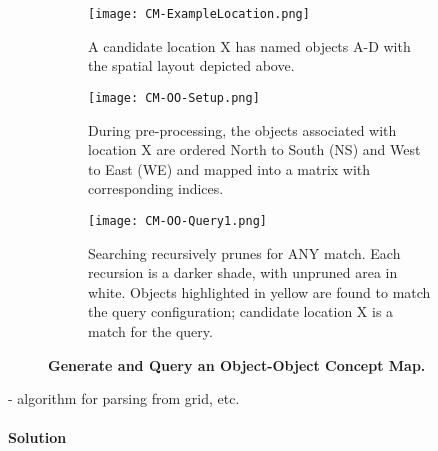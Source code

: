 \begin{figure*}[h]
    \centering
    
    \begin{subfigure}[t]{.3\textwidth}
        \texttt{[image: CM-ExampleLocation.png]}
        \caption{\small A candidate location X has named objects A-D with the spatial layout depicted above.} %
        \label{fig:CM-Example}
    \end{subfigure}
    \hfill
    \begin{subfigure}[t]{.3\textwidth}
        \texttt{[image: CM-OO-Setup.png]}
        \caption{\small During pre-processing, the objects associated with location X are ordered North to South (NS) and West to East (WE) and mapped into a matrix with corresponding indices.} %
        \label{fig:CM-OO-Setup}
    \end{subfigure}
    \hfill
        \begin{subfigure}[t]{.3\textwidth}
        \texttt{[image: CM-OO-Query1.png]}
        \caption{\small Searching recursively prunes for ANY match. Each recursion is a darker shade, with unpruned area in white. Objects highlighted in yellow are found to match the query configuration; candidate location X is a match for the query.}%
        \label{fig:CM-OO-Query}
    \hfill
    \end{subfigure}
    \caption{\textbf{Generate and Query an Object-Object Concept Map.}}\label{figure:ConceptMap} 
\end{figure*}
- algorithm for parsing from grid, etc.


\paragraph{Solution}

